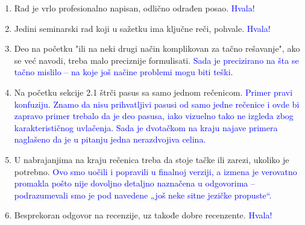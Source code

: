 \documentclass[a4paper]{report}
\newcommand{\odgovor}[1]{\textcolor{blue}{#1}}
\begin{document}
\begin{enumerate}
\item Rad je vrlo profesionalno napisan, odlično odrađen posao. \odgovor{Hvala!}

\item Jedini seminarski rad koji u sažetku ima ključne reči, pohvale. \odgovor{Hvala!}

\item Deo na početku "ili na neki drugi način komplikovan za tačno rešavanje", ako se već navodi, treba malo preciznije formulisati. \odgovor{Sada je precizirano na šta se tačno mislilo -- na koje još načine problemi mogu biti teški.}

\item Na početku sekcije 2.1 štrči pasus sa samo jednom rečenicom. \odgovor{Primer pravi konfuziju. Znamo da nisu prihvatljivi pasusi od samo jedne rečenice i ovde bi zapravo primer trebalo da je deo pasusa, iako vizuelno tako ne izgleda zbog karakterističnog uvlačenja. Sada je dvotačkom na kraju najave primera naglašeno da je u pitanju jedna nerazdvojiva celina.}

\item U nabrajanjima na kraju rečenica treba da stoje tačke ili zarezi, ukoliko je potrebno. \odgovor{Ovo smo uočili i popravili u finalnoj verziji, a izmena je verovatno promakla pošto nije dovoljno detaljno naznačena u odgovorima -- podrazumevali smo je pod navedene „još neke sitne jezičke propuste“.}

\item Besprekoran odgovor na recenzije, uz takođe dobre recenzente. \odgovor{Hvala!}
\end{enumerate}
\end{document}

